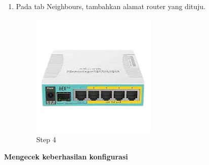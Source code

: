 \begin{enumerate}
	\item Pada tab Neighbours, tambahkan alamat router yang dituju.
	\begin{figure}[H]
		\centering
		\includegraphics[width=0.5\linewidth]{P1/img/contoh.png}
		\caption{Step 4}
		\label{fig:gambar13}
	\end{figure}

\end{enumerate}

\begin{center} 
	\textbf{Mengecek keberhasilan konfigurasi}
\end{center}

